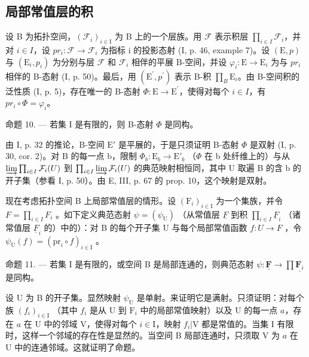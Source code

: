 \subsection{局部常值层的积}

设 B 为拓扑空间，\((\mathcal{F}_{i})_{i\in\mathrm{I}}\) 为 B 上的一个层族。用 \(\mathcal{F}\) 表示积层 \(\prod_{i\in I}\mathcal{F}_{i}\)，并对 \(i\in I\)，设 \(pr_{i}\colon \mathcal{F}\to\mathcal{F}_{i}\) 为指标 i 的投影态射 (I, p. 46, example 7)。设 \((\mathrm{E},p)\) 与 \((\mathrm{E}_{i},p_{i})\) 为分别与层 \(\mathcal{F}\) 和 \(\mathcal{F}_{i}\) 相伴的平展 B-空间，并设 \(\varphi_{i}\colon \mathrm{E}\to \mathrm{E}_{i}\) 为与 \(pr_{i}\) 相伴的 B-态射 (I, p. 50)。最后，用 \((\mathrm{E}^{\prime},p^{\prime})\) 表示 B-积 \(\prod_{B}\mathrm{E}_{i}\)。由 B-空间积的泛性质 (I, p. 5)，存在唯一的 B-态射 \(\Phi\colon \mathrm{E}\to \mathrm{E}^{\prime}\)，使得对每个 \(i\in I\)，有 \(pr_{i}\circ\Phi=\varphi_{i}\)。

命题 10. --- 若集 I 是有限的，则 B-态射 \(\Phi\) 是同构。

由 I, p. 32 的推论，B-空间 \(\mathrm{E}'\) 是平展的，于是只须证明 B-态射 \(\Phi\) 是双射 (I, p. 30, cor. 2)。对 B 的每一点 b，限制 \(\Phi_b\colon \mathrm{E}_b\to \mathrm{E}'_b\) （\(\Phi\) 在 b 处纤维上的）与从 \(\varinjlim\prod_{i\in I}\mathcal{F}_{i}(U)\) 到 \(\prod_{i\in I}\varinjlim\mathcal{F}_{i}(U)\) 的典范映射相恒同，其中 U 取遍 B 的含 b 的开子集（参看 I, p. 50）。由 E, III, p. 67 的 prop. 10，这个映射是双射。

现在考虑拓扑空间 B 上局部常值层的情形。设 \((\mathrm{F}_{i})_{i\in\mathrm{I}}\) 为一个集族，并令 \(F=\prod_{i\in I}F_{i}\) 。如下定义典范态射 \(\psi=(\psi_{\mathrm{U}})\) （从常值层 \(\underline{F}\) 到积 \(\prod_{i\in I}\underline{F}_{i}\) （诸常值层 \(\underline{F}_{i}\) 的）中的）：对 B 的每个开子集 U 与每个局部常值函数 \(f\colon U\to F\) ，令 \(\psi_{\mathrm{U}}(f)=(\mathrm{pr}_{i}\circ f)_{i\in\mathrm{I}}\) 。

命题 11. --- 若集 I 是有限的，或空间 B 是局部连通的，则典范态射 \(\psi\colon\underline{\mathbf{F}}\to\prod\underline{\mathbf{F}_{i}}\) 是同构。

设 U 为 B 的开子集。显然映射 \(\psi_{\mathrm{U}}\) 是单射。来证明它是满射。只须证明：对每个族 \((f_i)_{i\in \mathrm{I}}\) （其中 \(f_{i}\) 是从 U 到 \(\mathrm{F}_i\) 中的局部常值映射）以及 U 的每一点 \(a\)，存在 \(a\) 在 U 中的邻域 V，使得对每个 \(i\in \mathrm{I}\)，映射 \(f_{i}|\mathrm{V}\) 都是常值的。当集 I 有限时，这样一个邻域的存在性是显然的。当空间 B 局部连通时，只须取 V 为 \(a\) 在 U 中的连通邻域。这就证明了命题。

